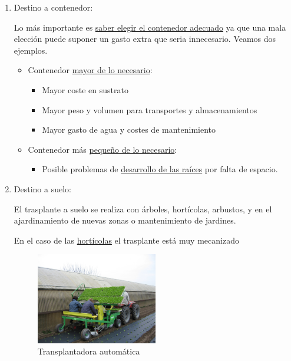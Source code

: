 \documentclass[a4paper,12pt,oneside]{article}
\begin{document}
\begin{enumerate}
\item Destino a contenedor:
\label{sec:orgd7bc561}

Lo más importante es \uline{saber elegir el contenedor adecuado} ya que una mala
elección puede suponer un gasto extra que seria innecesario. Veamos dos ejemplos.
\begin{itemize}
\item Contenedor \uline{mayor de lo necesario}:
\begin{itemize}
\item Mayor coste en sustrato
\item Mayor peso y volumen para transportes y almacenamientos
\item Mayor gasto de agua y costes de mantenimiento
\end{itemize}
\item Contenedor más \uline{pequeño de lo necesario}:
\begin{itemize}
\item Posible problemas de \uline{desarrollo de las raíces} por falta de espacio.
\end{itemize}
\end{itemize}

\item Destino a suelo:
\label{sec:org4fd8777}

El trasplante a suelo se realiza con árboles, hortícolas, arbustos, y en el
ajardinamiento de nuevas zonas o mantenimiento de jardines.

En el caso de las \uline{hortícolas} el trasplante está muy mecanizado 
\begin{figure}[htbp]
\centering
\includegraphics[width=0.5\textwidth]{./img_uf1596/transplantadora_suelo.jpg}
\caption{Transplantadora automática}
\end{figure}


\end{enumerate}
\end{document}
